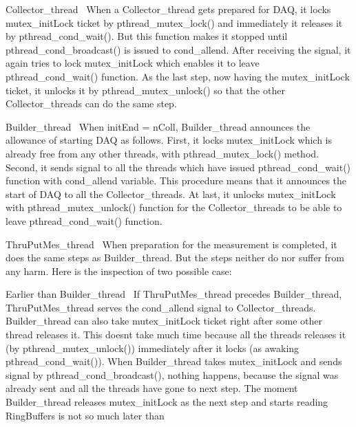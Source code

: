 \begin{DoxyItemize}
\item Collector\+\_\+thread~\newline
 When a Collector\+\_\+thread gets prepared for D\+AQ, it locks {\ttfamily mutex\+\_\+init\+Lock} ticket by {\ttfamily pthread\+\_\+mutex\+\_\+lock()} and immediately it releases it by {\ttfamily pthread\+\_\+cond\+\_\+wait()}. But this function makes it stopped until {\ttfamily pthread\+\_\+cond\+\_\+broadcast()} is issued to {\ttfamily cond\+\_\+allend}. After receiving the signal, it again tries to lock {\ttfamily mutex\+\_\+init\+Lock} which enables it to leave {\ttfamily pthread\+\_\+cond\+\_\+wait()} function. As the last step, now having the {\ttfamily mutex\+\_\+init\+Lock} ticket, it unlocks it by {\ttfamily pthread\+\_\+mutex\+\_\+unlock()} so that the other Collector\+\_\+threads can do the same step.
\item Builder\+\_\+thread~\newline
 When {\ttfamily init\+End} = {\ttfamily n\+Coll}, Builder\+\_\+thread announces the allowance of starting D\+AQ as follows. First, it locks {\ttfamily mutex\+\_\+init\+Lock} which is already free from any other threads, with pthread\+\_\+mutex\+\_\+lock() method. Second, it sends signal to all the threads which have issued {\ttfamily pthread\+\_\+cond\+\_\+wait()} function with {\ttfamily cond\+\_\+allend} variable. This procedure means that it announces the start of D\+AQ to all the Collector\+\_\+threads. At last, it unlocks {\ttfamily mutex\+\_\+init\+Lock} with {\ttfamily pthread\+\_\+mutex\+\_\+unlock()} function for the Collector\+\_\+threads to be able to leave {\ttfamily pthread\+\_\+cond\+\_\+wait()} function.
\item Thru\+Put\+Mes\+\_\+thread~\newline
 When preparation for the measurement is completed, it does the same steps as Builder\+\_\+thread. But the steps neither do nor suffer from any harm. Here is the inspection of two possible case\+:
\begin{DoxyItemize}
\item Earlier than Builder\+\_\+thread~\newline
 If Thru\+Put\+Mes\+\_\+thread precedes Builder\+\_\+thread, Thru\+Put\+Mes\+\_\+thread serves the {\ttfamily cond\+\_\+allend} signal to Collector\+\_\+threads. Builder\+\_\+thread can also take {\ttfamily mutex\+\_\+init\+Lock} ticket right after some other thread releases it. This doesn\textquotesingle{}t take much time because all the threads releases it (by {\ttfamily pthread\+\_\+mutex\+\_\+unlock()}) immediately after it locks (as awaking {\ttfamily pthread\+\_\+cond\+\_\+wait()}). When Builder\+\_\+thread takes {\ttfamily mutex\+\_\+init\+Lock} and sends signal by {\ttfamily pthread\+\_\+cond\+\_\+broadcast()}, nothing happens, because the signal was already sent and all the threads have gone to next step. The moment Builder\+\_\+thread releases {\ttfamily mutex\+\_\+init\+Lock} as the next step and starts reading Ring\+Buffers is not so much later than

\end{DoxyItemize}
\end{DoxyItemize}
